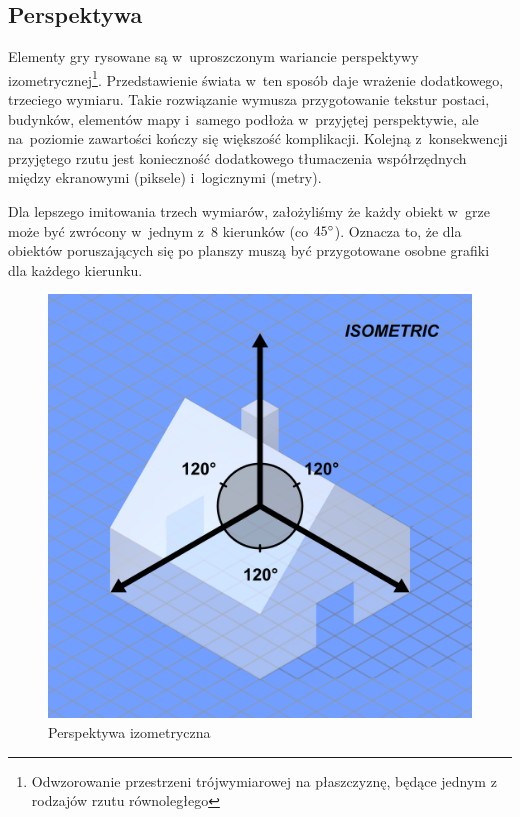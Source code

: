 \documentclass[licencjacka]{pracamgr}
\begin{document}
    \subsection{Perspektywa}      
      Elementy gry rysowane są w~uproszczonym wariancie perspektywy izometrycznej\footnote{Odwzorowanie przestrzeni
      trójwymiarowej na płaszczyznę, będące jednym z rodzajów rzutu równoległego}. Przedstawienie świata w~ten sposób
      daje wrażenie dodatkowego, trzeciego wymiaru. Takie rozwiązanie wymusza przygotowanie tekstur postaci, budynków,
      elementów mapy i~samego podłoża w~przyjętej perspektywie, ale na~poziomie zawartości kończy się większość
      komplikacji. Kolejną z~konsekwencji przyjętego rzutu jest konieczność dodatkowego tłumaczenia współrzędnych między
      ekranowymi (piksele) i~logicznymi (metry).

      Dla lepszego imitowania trzech wymiarów, założyliśmy że każdy obiekt w~grze może być zwrócony w~jednym z~8 kierunków
      (co $45\degree$). Oznacza to, że dla obiektów poruszających się po planszy muszą być przygotowane osobne grafiki
      dla każdego kierunku.
      \begin{figure}[h]
        \centering
        \includegraphics[scale=0.25]{izo.png}
        \caption{Perspektywa izometryczna\protect\footnotemark}
      \end{figure}
\end{document}

